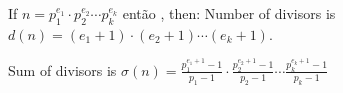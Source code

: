 If $n = p_1^{e_1} \cdot p_2^{e_2} \cdots p_k^{e_k}$ então , then:
Number of divisors is $d(n) = (e_1 + 1) \cdot (e_2 + 1) \cdots (e_k + 1)$.

Sum of divisors is $\sigma(n) = \frac{p_1^{e_1 + 1} - 1}{p_1 - 1} \cdot \frac{p_2^{e_2 + 1} - 1}{p_2 - 1} \cdots \frac{p_k^{e_k + 1} - 1}{p_k - 1}$
